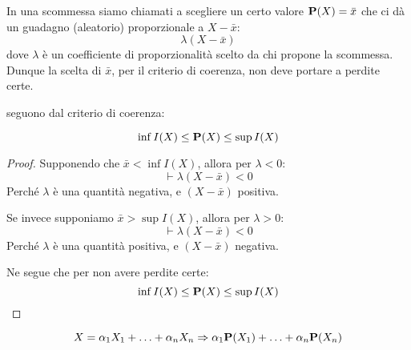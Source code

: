 \begin{example}[Scommessa]
  In una scommessa siamo chiamati a scegliere un certo valore \( \mathbf{P}(X) = \bar{x} \) che ci dà un guadagno (aleatorio) proporzionale a \( X -\bar{x} \):
    \[ \lambda(X-\bar{x}) \]
  dove \( \lambda \) è un coefficiente di proporzionalità scelto da chi propone la scommessa.
  Dunque la scelta di $\bar{x}$, per il criterio di coerenza, non deve portare a perdite certe.
\end{example}

 seguono dal criterio di coerenza:

\begin{proposition}\label{pro:monotonia_previsione}
  \[ \inf I(X) \leq \mathbf{P}(X) \leq \sup I(X) \]
\end{proposition}

\begin{proof}
  Supponendo che \( \bar{x} < \inf I(X) \), allora per \( \lambda < 0 \):
  \[ \vdash \lambda(X - \bar{x}) < 0 \]
  Perché $\lambda$ è una quantità negativa, e \( (X - \bar{x}) \) positiva.

  Se invece supponiamo \( \bar{x} > \sup I(X) \), allora per \( \lambda > 0 \):
  \[ \vdash \lambda(X - \bar{x}) < 0 \]
  Perché $\lambda$ è una quantità positiva, e \( (X - \bar{x}) \) negativa.

  Ne segue che per non avere perdite certe:
  \[ \inf I(X) \leq \mathbf{P}(X) \leq \sup I(X) \]
\end{proof}

\begin{proposition}\label{pro:linearita_previsione}
  \[ X = \alpha_1 X_1 + \ldots + \alpha_n X_n \Rightarrow \alpha_1 \mathbf{P}(X_1) + \ldots + \alpha_n \mathbf{P}(X_n) \]
\end{proposition}

